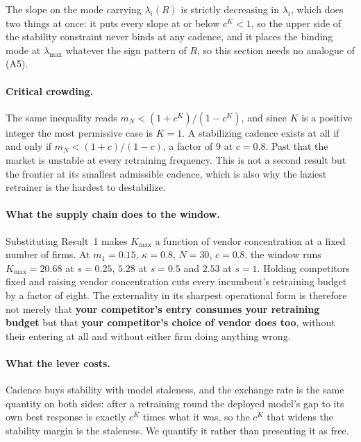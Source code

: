 \documentclass{article}
\theoremstyle{plain}
\theoremstyle{definition}
\newcommand{\mN}{m_N}
\newcommand{\lmax}{\lambda_{\max}}
\begin{document}
The slope on the mode carrying $\lambda_i(R)$ is strictly decreasing in $\lambda_i$, which does two things at once: it puts every slope at or below $c^K<1$, so the upper side of the stability constraint never binds at any cadence, and it places the binding mode at $\lmax$ whatever the sign pattern of $R$, so this section needs no analogue of (A5).

\paragraph{Critical crowding.}
The same inequality reads $\mN < (1+c^K)/(1-c^K)$, and since $K$ is a positive integer the most permissive case is $K=1$. A stabilizing cadence exists at all if and only if $\mN < (1+c)/(1-c)$, a factor of $9$ at $c=0.8$. Past that the market is unstable at every retraining frequency. This is not a second result but the frontier at its smallest admissible cadence, which is also why the laziest retrainer is the hardest to destabilize.

\paragraph{What the supply chain does to the window.}
Substituting Result~1 makes $K_{\max}$ a function of vendor concentration at a fixed number of firms. At $m_1 = 0.15$, $\kappa = 0.8$, $N=30$, $c=0.8$, the window runs $K_{\max} = 20.68$ at $s = 0.25$, $5.28$ at $s=0.5$ and $2.53$ at $s=1$. Holding competitors fixed and raising vendor concentration cuts every incumbent's retraining budget by a factor of eight. The externality in its sharpest operational form is therefore not merely that \textbf{your competitor's entry consumes your retraining budget} but that \textbf{your competitor's choice of vendor does too}, without their entering at all and without either firm doing anything wrong.

\paragraph{What the lever costs.}
Cadence buys stability with model staleness, and the exchange rate is the same quantity on both sides: after a retraining round the deployed model's gap to its own best response is exactly $c^K$ times what it was, so the $c^K$ that widens the stability margin is the staleness. We quantify it rather than presenting it as free.
\end{document}
